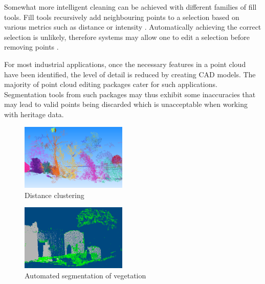\documentclass[10pt,twocolumn]{article}
\begin{document}
Somewhat more intelligent cleaning can be achieved with different families of fill tools. Fill tools recursively add neighbouring points to a selection based on various metrics such as distance or intensity \cite{Pointools2012}. Automatically achieving the correct selection is unlikely, therefore systems may allow one to edit a selection before removing points \cite{Pointools2012}.


For most industrial applications, once the necessary features in a point cloud have been identified, the level of detail is reduced by creating CAD models. The majority of point cloud editing packages cater for such applications. Segmentation tools from such packages may thus exhibit some inaccuracies that may lead to valid points being discarded which is unacceptable when working with heritage data.


\begin{figure}[htb]
\centering
\includegraphics[width=0.45\textwidth]{pics/3dreshaper.png}
\caption{Distance clustering \cite{Technodigit2012}}
\label{fig:dist}
\end{figure}

\begin{figure}[htb]
\centering
\includegraphics[width=0.45\textwidth]{pics/vrmesh-veg.png}
\caption{Automated segmentation of vegetation \cite{VirtualGrid2012}}
\label{fig:trees}
\end{figure}
\end{document}
